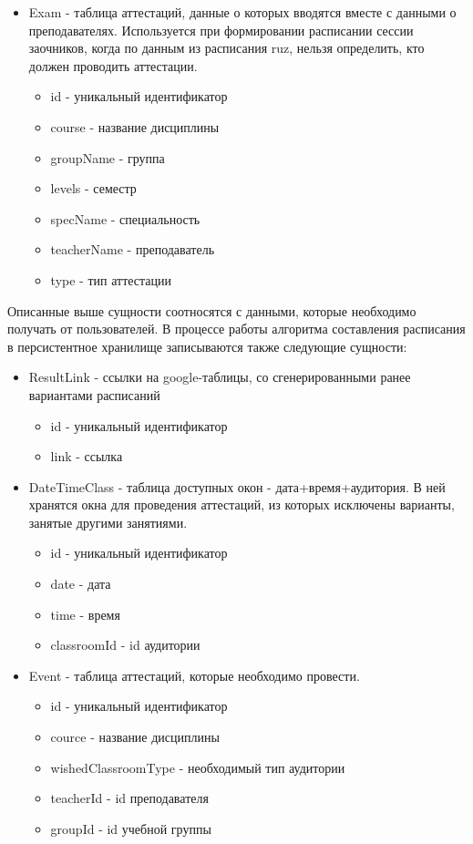 \begin{itemize}
	\item Exam - таблица аттестаций, данные о которых вводятся вместе с данными о преподавателях. Используется при формировании расписании сессии заочников, когда по данным из расписания ruz, нельзя определить, кто должен проводить аттестации.
	\begin{itemize}
		\item id - уникальный идентификатор
		\item course - название дисциплины
		\item groupName - группа
		\item levels - семестр
		\item specName - специальность
		\item teacherName - преподаватель
		\item type - тип аттестации
	\end{itemize} 
\end{itemize}

Описанные выше сущности соотносятся с данными, которые необходимо получать от пользователей. В процессе работы алгоритма составления расписания в персистентное хранилище записываются также следующие сущности: 
\begin{itemize}
	\item ResultLink - ссылки на google-таблицы, со сгенерированными ранее вариантами расписаний 
	\begin{itemize}
		\item id - уникальный идентификатор
		\item link - ссылка
	\end{itemize} 
	
	\item DateTimeClass - таблица доступных окон - дата+время+аудитория. В ней хранятся окна для проведения аттестаций, из которых исключены варианты, занятые другими занятиями.
	\begin{itemize}
		\item id - уникальный идентификатор
		\item date - дата
		\item time - время
		\item classroomId - id аудитории
	\end{itemize} 
	
	\item Event - таблица аттестаций, которые необходимо провести.
	\begin{itemize}
		\item id - уникальный идентификатор
		\item cource - название дисциплины
		\item wishedClassroomType - необходимый тип аудитории
		\item teacherId - id преподавателя
		\item groupId - id учебной группы
	\end{itemize} 
\end{itemize}

